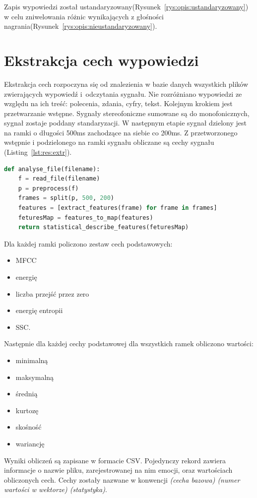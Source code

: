 \documentclass[a4paper,12pt,twoside,openany]{report}
\newcommand{\Rys}[1]{(Rysunek~\ref{#1})}
\newcommand{\Lst}[1]{(Listing~\ref{#1})}
\begin{document}
Zapis wypowiedzi został ustandaryzowany\Rys{rys:opis:ustandaryzowany} w celu zniwelowania różnic wynikających z głośności nagrania\Rys{rys:opis:nieustandaryzowany}.
\section{Ekstrakcja cech wypowiedzi}
Ekstrakcja cech rozpoczyna się od znalezienia w bazie danych wszystkich plików zwierających wypowiedź i~odczytania sygnału. 
Nie rozróżniano wypowiedzi ze względu na ich treść: polecenia, zdania, cyfry, tekst.
Kolejnym krokiem jest przetwarzanie wstępne. 
Sygnały stereofoniczne sumowane są do monofonicznych, sygnał zostaje poddany standaryzacji.
W następnym etapie sygnał dzielony jest na ramki o długości 500ms zachodzące na siebie co 200ms.
Z przetworzonego wstępnie i podzielonego na ramki sygnału obliczane są cechy sygnału \Lst{lst:res:extr}.
\begin{lstlisting}[language=Python,label={lst:res:extr},caption={funkcja obliczająca cechy sygnału pojedynczego pliku}]
def analyse_file(filename):
    f = read_file(filename)
    p = preprocess(f)
    frames = split(p, 500, 200)
    features = [extract_features(frame) for frame in frames]
    feturesMap = features_to_map(features)
    return statistical_describe_features(feturesMap)
\end{lstlisting}
Dla każdej ramki policzono zestaw cech podstawowych: 
\begin{itemize}
	\item MFCC
	\item energię
	\item liczba przejść przez zero
	\item energię entropii
	\item SSC.
\end{itemize}
Następnie dla każdej cechy podstawowej dla wszystkich ramek obliczono wartości:
\begin{itemize}
	\item minimalną
	\item maksymalną
	\item średnią
	\item kurtozę
	\item skośność
	\item wariancję
\end{itemize}
Wyniki obliczeń są zapisane w formacie CSV.
Pojedynczy rekord zawiera informacje o nazwie pliku, zarejestrowanej na nim emocji, 
oraz wartościach obliczonych cech.
Cechy zostały nazwane w konwencji \textit{(cecha bazowa) (numer wartości w wektorze) (statystyka)}.
\end{document}
